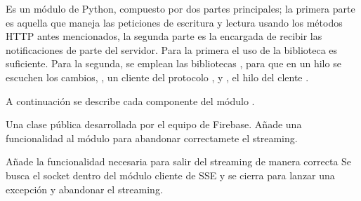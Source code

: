 Es un módulo de Python, compuesto por dos partes principales; la primera parte
es aquella que maneja las peticiones de escritura y lectura usando los métodos
HTTP antes mencionados, la segunda parte es la encargada de recibir las
notificaciones de parte del servidor. Para la primera el uso de la biblioteca
 es suficiente. Para la segunda, se emplean las bibliotecas
, para que en un hilo se escuchen los cambios, ,
un cliente del protocolo , y , el hilo del clente .

A continuación se describe cada componente del módulo .

\label{\detokenize{nao_firebase:module-firebase}}

\begin{fulllineitems}
\label{\detokenize{nao_firebase:firebase.ClosableSSEClient}}
Una clase pública desarrollada por el equipo de Firebase.
Añade una funcionalidad al módulo  para
abandonar correctamete el streaming.

\begin{fulllineitems}
\label{\detokenize{nao_firebase:firebase.ClosableSSEClient.close}}
Añade la funcionalidad necesaria para salir del streaming de manera correcta
Se busca el socket dentro del módulo cliente de SSE y se cierra para lanzar una
excepción y abandonar el streaming.

\end{fulllineitems}


\end{fulllineitems}



